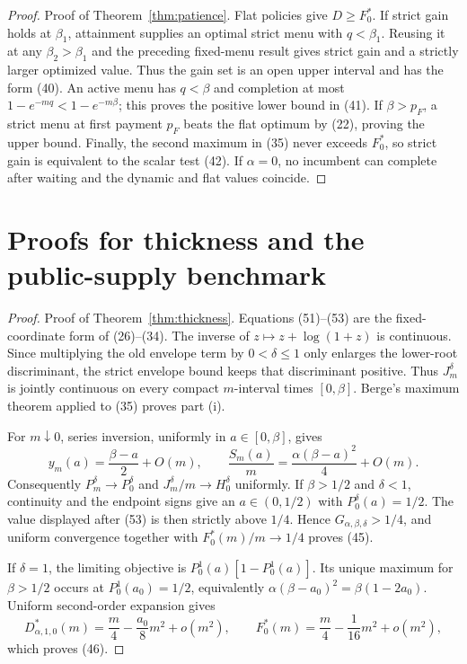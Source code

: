 \documentclass[mnsc,dblanonrev]{informs4}
\begin{document}
\begin{APPENDICES}
\begin{proof}{Proof of Theorem~\ref{thm:patience}.}
Flat policies give $D\ge F_0^*$.  If strict gain holds at $\beta_1$,
attainment supplies an optimal strict menu with $q<\beta_1$.  Reusing it at
any $\beta_2>\beta_1$ and the preceding fixed-menu result gives strict gain
and a strictly larger optimized value.  Thus the gain set is an open upper
interval and has the form (40).  An active menu has $q<\beta$ and completion
at most $1-e^{-mq}<1-e^{-m\beta}$; this proves the positive lower bound in
(41).  If $\beta>p_F$, a strict menu at first payment $p_F$ beats the flat
optimum by (22), proving the upper bound.  Finally, the second maximum in
(35) never exceeds $F_0^*$, so strict gain is equivalent to the scalar test
(42).  If $\alpha=0$, no incumbent can complete after waiting and the
dynamic and flat values coincide.
\Halmos\end{proof}

\section{Proofs for thickness and the public-supply benchmark}
\label{app:thickness}

\begin{proof}{Proof of Theorem~\ref{thm:thickness}.}
Equations (51)--(53) are the fixed-coordinate form of (26)--(34).  The
inverse of $z\mapsto z+\log(1+z)$ is continuous.  Since multiplying the old
envelope term by $0<\delta\le1$ only enlarges the lower-root discriminant,
the strict envelope bound keeps that discriminant positive.  Thus
$J_m^\delta$ is jointly continuous on every compact $m$-interval times
$[0,\beta]$.  Berge's maximum theorem applied to (35) proves part (i).

For $m\downarrow0$, series inversion, uniformly in $a\in[0,\beta]$, gives
\[
 y_m(a)=\frac{\beta-a}{2}+O(m),\qquad
 \frac{S_m(a)}m=\frac{\alpha(\beta-a)^2}{4}+O(m).
\]
Consequently $P_m^\delta\to P_0^\delta$ and
$J_m^\delta/m\to H_0^\delta$ uniformly.  If $\beta>1/2$ and $\delta<1$,
continuity and the endpoint signs give an $a\in(0,1/2)$ with
$P_0^\delta(a)=1/2$.  The value displayed after (53) is then strictly above
$1/4$.  Hence $G_{\alpha,\beta,\delta}>1/4$, and uniform convergence together
with $F_0^*(m)/m\to1/4$ proves (45).

If $\delta=1$, the limiting objective is
$P_0^1(a)[1-P_0^1(a)]$.  Its unique maximum for $\beta>1/2$ occurs at
$P_0^1(a_0)=1/2$, equivalently
$\alpha(\beta-a_0)^2=\beta(1-2a_0)$.  Uniform second-order expansion gives
\[
 D_{\alpha,1,0}^*(m)=\frac m4-\frac{a_0}{8}m^2+o(m^2),
 \qquad F_0^*(m)=\frac m4-\frac1{16}m^2+o(m^2),
\]
which proves (46).


\end{proof}
\end{APPENDICES}
\end{document}
